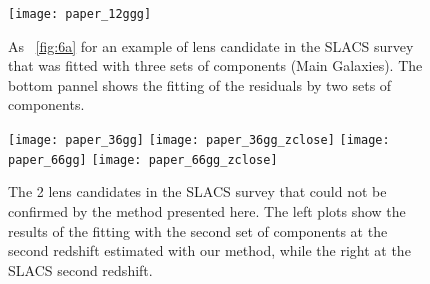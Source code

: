 \documentclass[12pt,preprint]{aastex}
\begin{document}
\clearpage
\begin{figure}
\texttt{[image: paper\_12ggg]}
\caption{As \figurename~\ref{fig:6a} for an example of lens candidate in the SLACS survey
  that was fitted with three sets of components (Main Galaxies).
  The bottom pannel shows the fitting of the residuals by two
  sets of components.}
\label{fig:8}
\end{figure}

\clearpage
\begin{figure}
\texttt{[image: paper\_36gg]}
\texttt{[image: paper\_36gg\_zclose]}
\texttt{[image: paper\_66gg]}
\texttt{[image: paper\_66gg\_zclose]}
\caption{The 2 lens candidates in the SLACS survey that could not be confirmed by the
  method presented here. The left plots show the results of the
  fitting with the second set of components at the second redshift
  estimated with our method, while the right at the SLACS second
  redshift.}
\label{fig:9}
\end{figure}
\end{document}
